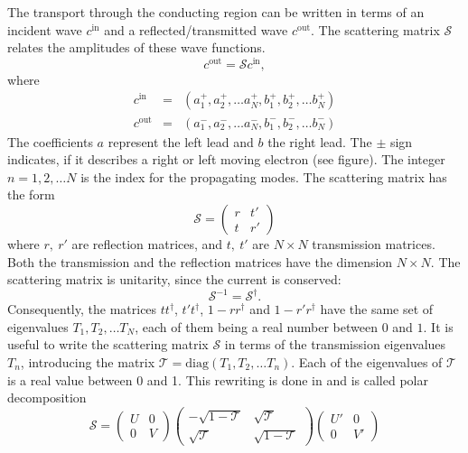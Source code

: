 The transport through the conducting region can be written in terms of an incident wave $c^\text{in}$ and a reflected/transmitted wave $c^\text{out}$. The scattering matrix $\mathcal{S}$ relates the amplitudes of these wave functions.
\begin{equation}
c^{\text{out}} = \mathcal{S} c^{\text{in}},
\end{equation}
where
\begin{eqnarray}
c^\text{in} &=& \left( a_1^+, a_2^+, \dots a_N^+, b_1^+, b_2^+, \dots b_N^+ \right) \\
c^\text{out} &=& \left( a_1^-, a_2^-, \dots a_N^-, b_1^-, b_2^-, \dots b_N^- \right)
\end{eqnarray}
The coefficients $a$ represent the left lead and $b$ the right lead. The $\pm$ sign indicates, if it describes a right or left moving electron (see figure). The integer $n = 1, 2, \dots N$ is the index for the propagating modes. %
The scattering matrix has the form
\begin{equation}
\mathcal{S} = \begin{pmatrix} r & t' \\ t & r'\end{pmatrix}
\end{equation}
where $r,\ r'$ are reflection matrices, and $t,\ t'$ are $N \times N $ transmission matrices. Both the transmission and the reflection matrices have the dimension $N \times N$. The scattering matrix is unitarity, since the current is conserved:
\begin{equation}
\mathcal{S}^{-1} = \mathcal{S}^\dagger.
\end{equation}
Consequently, the matrices $tt^\dagger$, $t't^\dagger$, $1-rr^\dagger$ and $1-r'r^\dagger$ have the same set of eigenvalues $T_1, T_2, \dots T_N$, each of them being a real number between $0$ and $1$.
It is useful to write the scattering matrix $\mathcal{S}$ in terms of the transmission eigenvalues $T_n$, introducing the matrix $\mathcal{T} = \text{diag} ( T_1, T_2, \dots T_n )$. Each of the eigenvalues of $\mathcal{T}$ is a real value between 0 and 1. This rewriting is done in \cite{Mello1988} and is called polar decomposition
\begin{equation}
\mathcal{S} = \begin{pmatrix} U & 0 \\ 0 & V\end{pmatrix} \begin{pmatrix} - \sqrt{1 - \mathcal{T}} & \sqrt{\mathcal{T}} \\ \sqrt{\mathcal{T}}& \sqrt{1 - \mathcal{T}} \end{pmatrix} \begin{pmatrix} U' & 0 \\ 0 & V' \end{pmatrix}
\end{equation}
